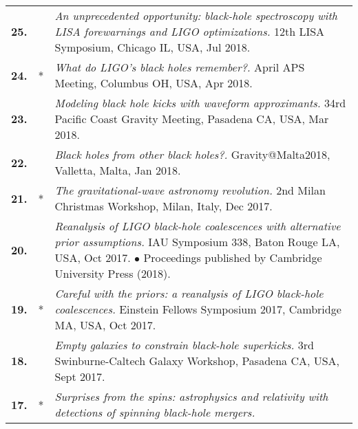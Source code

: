 {\begin{longtable}{rp{0.3cm}p{15.8cm}}
%
\textbf{25.} &  & \textit{An unprecedented opportunity: black-hole spectroscopy with LISA forewarnings and LIGO optimizations.}
\newline{}
12th LISA Symposium, Chicago IL, USA, Jul 2018.
\vspace{0.05cm}\\
%
\textbf{24.} & * & \textit{What do LIGO's black holes remember?.}
\newline{}
April APS Meeting, Columbus OH, USA, Apr 2018.
\vspace{0.05cm}\\
%
\textbf{23.} &  & \textit{Modeling black hole kicks with waveform approximants.}
\newline{}
34rd Pacific Coast Gravity Meeting, Pasadena CA, USA, Mar 2018.
\vspace{0.05cm}\\
%
\textbf{22.} &  & \textit{Black holes from other black holes?.}
\newline{}
Gravity@Malta2018, Valletta, Malta, Jan 2018.
\vspace{0.05cm}\\
%
\textbf{21.} & * & \textit{The gravitational-wave astronomy revolution.}
\newline{}
2nd Milan Christmas Workshop, Milan, Italy, Dec 2017.
\vspace{0.05cm}\\
%
\textbf{20.} &  & \textit{Reanalysis of LIGO black-hole coalescences with alternative prior assumptions.}
\newline{}
IAU Symposium 338, Baton Rouge LA, USA, Oct 2017.
\newline{}
\textcolor{color1}{$\bullet$} Proceedings published by Cambridge University Press (2018).
\vspace{0.05cm}\\
%
\textbf{19.} & * & \textit{Careful with the priors: a reanalysis of LIGO black-hole coalescences.}
\newline{}
Einstein Fellows Symposium 2017, Cambridge MA, USA, Oct 2017.
\vspace{0.05cm}\\
%
\textbf{18.} &  & \textit{Empty galaxies to constrain black-hole superkicks.}
\newline{}
3rd Swinburne-Caltech Galaxy Workshop, Pasadena CA, USA, Sept 2017.
\vspace{0.05cm}\\
%
\textbf{17.} & * & \textit{Surprises from the spins: astrophysics and relativity with detections of spinning black-hole mergers.}

\end{longtable}}
